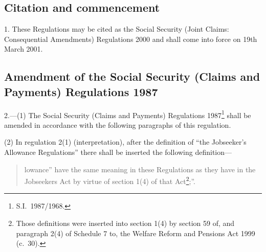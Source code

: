 \documentclass[12pt,a4paper]{article}
\begin{document}
\subsection[1. Citation and commencement]{Citation and commencement}

1.  These Regulations may be cited as the Social Security (Joint Claims: Consequential Amendments) Regulations 2000 and shall come into force on 19th March 2001.

\subsection[2. Amendment of the Social Security (Claims and Payments) Regulations 1987]{Amendment of the Social Security (Claims and Payments) Regulations 1987}

2.---(1)  The Social Security (Claims and Payments) Regulations 1987\footnote{S.I.\ 1987/1968.} shall be amended in accordance with the following paragraphs of this regulation.

(2) In regulation 2(1) (interpretation), after the definition of “the Jobseeker’s Allowance Regulations” there shall be inserted the following definition—
\begin{quotation}
\begin{sloppypar}
    lowance” have the same meaning in these Regulations as they have in the Jobseekers Act by virtue of section 1(4) of that Act\footnote{Those definitions were inserted into section 1(4) by section 59 of, and paragraph 2(4) of Schedule 7 to, the Welfare Reform and Pensions Act 1999 (c.\ 30).};”. 
\end{sloppypar}
\end{quotation}
\end{document}
